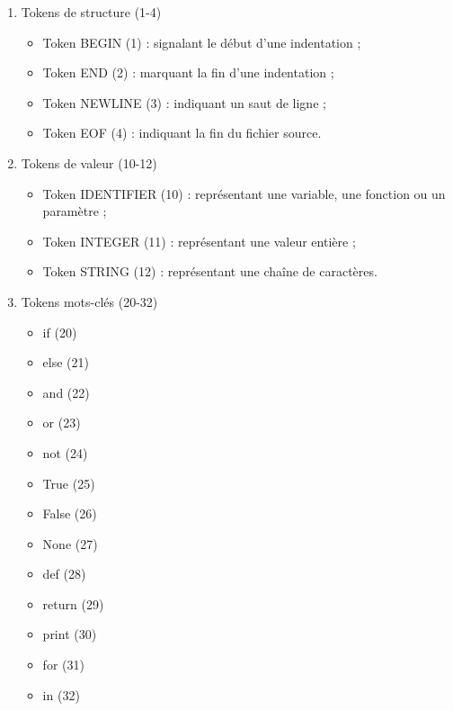 \documentclass[a4paper, 12pt]{report}
\begin{document}
\begin{enumerate}

\item Tokens de structure (1-4)
\begin{itemize}
\item Token BEGIN (1) : signalant le début d'une indentation ;
\item Token END (2) : marquant la fin d'une indentation ;
\item Token NEWLINE (3) : indiquant un saut de ligne ;
\item Token EOF (4) : indiquant la fin du fichier source.\\
\end{itemize}

\item Tokens de valeur (10-12)
\begin{itemize}
\item Token IDENTIFIER (10) : représentant une variable, une fonction ou un paramètre ;
\item Token INTEGER (11) : représentant une valeur entière ;
\item Token STRING (12) : représentant une chaîne de caractères.\\
\end{itemize}

\item Tokens mots-clés (20-32)
\begin{itemize}
\item if (20)
\item else (21)
\item and (22)
\item or (23)
\item not (24)
\item True (25)
\item False (26)
\item None (27)
\item def (28)
\item return (29)
\item print (30)
\item for (31)
\item in (32)\\
\end{itemize}


\end{enumerate}
\end{document}

